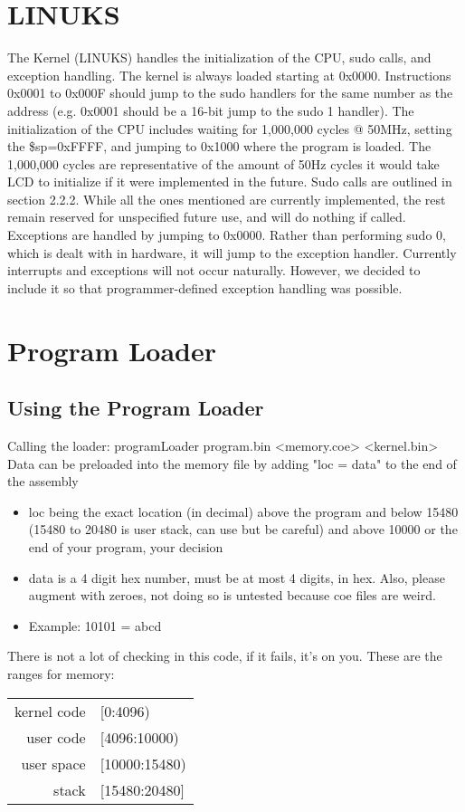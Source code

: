 \section{LINUKS}
The Kernel (LINUKS) handles the initialization of the CPU, sudo calls, and exception handling. The kernel is always loaded starting at 0x0000. Instructions 0x0001 to 0x000F should jump to the sudo handlers for the same number as the address (e.g. 0x0001 should be a 16-bit jump to the sudo 1 handler).  The initialization of the CPU includes waiting for 1,000,000 cycles @ 50MHz, setting the \$sp=0xFFFF, and jumping to 0x1000 where the program is loaded.  The 1,000,000 cycles are representative of the amount of 50Hz cycles it would take LCD to initialize if it were implemented in the future.  Sudo calls are outlined in section 2.2.2. While all the ones mentioned are currently implemented, the rest remain reserved for unspecified future use, and will do nothing if called.  Exceptions are handled by jumping to 0x0000. Rather than performing sudo 0, which is dealt with in hardware, it will jump to the exception handler. Currently interrupts and exceptions will not occur naturally. However, we decided to include it so that programmer-defined exception handling was possible.
\section{Program Loader}
	\subsection{Using the Program Loader}
		Calling the loader:  programLoader program.bin <memory.coe> <kernel.bin>\\
		Data can be preloaded into the memory file by adding "loc = data" to the end of the assembly
		\begin{itemize}
			\item loc being the exact location (in decimal) above the program and below 15480 (15480 to 20480 is user stack, can use but be careful) and above 10000 or the end of your program, your decision
			\item data is a 4 digit hex number, must be at most 4 digits, in hex.  Also, please augment with zeroes, not doing so is untested because coe files are weird.
			\item Example:  10101 = abcd
		\end{itemize}
		There is not a lot of checking in this code, if it fails, it's on you.  These are the ranges for memory:
		\begin{center} \begin{tabular}{ r l }
			kernel code & [0:4096) \\
			user code   & [4096:10000) \\
			user space  & [10000:15480) \\
			stack       & [15480:20480] \\
		\end{tabular} \end{center}
